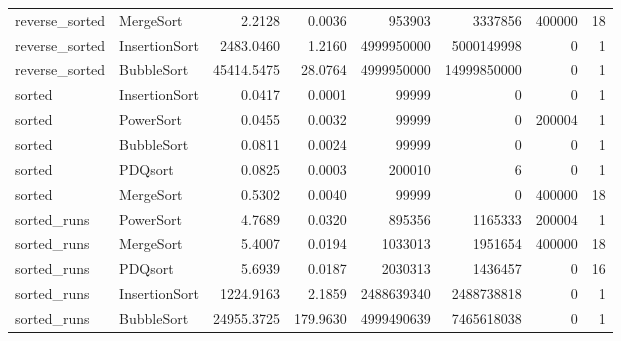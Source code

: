 \begin{table}[htbp]
{\begin{tabular}{llrrrrrr}
reverse\_sorted & MergeSort & 2.2128 & 0.0036 & 953903 & 3337856 & 400000 & 18 \\
reverse\_sorted & InsertionSort & 2483.0460 & 1.2160 & 4999950000 & 5000149998 & 0 & 1 \\
reverse\_sorted & BubbleSort & 45414.5475 & 28.0764 & 4999950000 & 14999850000 & 0 & 1 \\
sorted & InsertionSort & 0.0417 & 0.0001 & 99999 & 0 & 0 & 1 \\
sorted & PowerSort & 0.0455 & 0.0032 & 99999 & 0 & 200004 & 1 \\
sorted & BubbleSort & 0.0811 & 0.0024 & 99999 & 0 & 0 & 1 \\
sorted & PDQsort & 0.0825 & 0.0003 & 200010 & 6 & 0 & 1 \\
sorted & MergeSort & 0.5302 & 0.0040 & 99999 & 0 & 400000 & 18 \\
sorted\_runs & PowerSort & 4.7689 & 0.0320 & 895356 & 1165333 & 200004 & 1 \\
sorted\_runs & MergeSort & 5.4007 & 0.0194 & 1033013 & 1951654 & 400000 & 18 \\
sorted\_runs & PDQsort & 5.6939 & 0.0187 & 2030313 & 1436457 & 0 & 16 \\
sorted\_runs & InsertionSort & 1224.9163 & 2.1859 & 2488639340 & 2488738818 & 0 & 1 \\
sorted\_runs & BubbleSort & 24955.3725 & 179.9630 & 4999490639 & 7465618038 & 0 & 1 \\
\hline
\end{tabular}%
}
\end{table}

